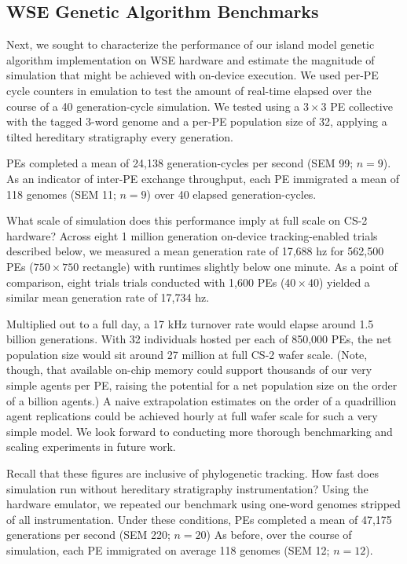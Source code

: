 \subsection{WSE Genetic Algorithm Benchmarks}

Next, we sought to characterize the performance of our island model genetic algorithm implementation on WSE hardware and estimate the magnitude of simulation that might be achieved with on-device execution.
We used per-PE cycle counters in emulation to test the amount of real-time elapsed over the course of a 40 generation-cycle simulation.
We tested using a $3\times3$ PE collective with the tagged 3-word genome and a per-PE population size of 32, applying a tilted hereditary stratigraphy every generation.

PEs completed a mean of 24,138 generation-cycles per second (SEM 99; $n=9$).
As an indicator of inter-PE exchange throughput, each PE immigrated a mean of 118 genomes (SEM 11; $n=9$) over 40 elapsed generation-cycles.

What scale of simulation does this performance imply at full scale on CS-2 hardware?
Across eight 1 million generation on-device tracking-enabled trials described below, we measured a mean generation rate of 17,688 hz for 562,500 PEs ($750\times750$ rectangle) with runtimes slightly below one minute.
As a point of comparison, eight trials trials conducted with 1,600 PEs ($40\times40$) yielded a similar mean generation rate of 17,734 hz.

Multiplied out to a full day, a 17 kHz turnover rate would elapse around 1.5 billion generations.
With 32 individuals hosted per each of 850,000 PEs, the net population size would sit around 27 million at full CS-2 wafer scale.
(Note, though, that available on-chip memory could support thousands of our very simple agents per PE, raising the potential for a net population size on the order of a billion agents.)
A naive extrapolation estimates on the order of a quadrillion agent replications could be achieved hourly at full wafer scale for such a very simple model.
We look forward to conducting more thorough benchmarking and scaling experiments in future work.

Recall that these figures are inclusive of phylogenetic tracking.
How fast does simulation run without hereditary stratigraphy instrumentation?
Using the hardware emulator, we repeated our benchmark using one-word genomes stripped of all instrumentation.
Under these conditions, PEs completed a mean of 47,175 generations per second (SEM 220; $n=20$)
As before, over the course of simulation, each PE immigrated on average 118 genomes (SEM 12; $n=12$).

